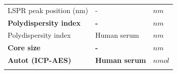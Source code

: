\documentclass[utf8]{frontiersHLTH} %
\begin{document}
\begin{longtable}[]{@{}lll@{}}
\begin{minipage}[t]{0.58\columnwidth}
LSPR peak position (nm)\strut
\end{minipage} & \begin{minipage}[t]{0.20\columnwidth}\raggedright\strut
-\strut
\end{minipage} & \begin{minipage}[t]{0.13\columnwidth}\raggedright\strut
\(nm\)\strut
\end{minipage}\tabularnewline
\begin{minipage}[t]{0.58\columnwidth}\raggedright\strut
\textbf{Polydispersity index}\strut
\end{minipage} & \begin{minipage}[t]{0.20\columnwidth}\raggedright\strut
\textbf{-}\strut
\end{minipage} & \begin{minipage}[t]{0.13\columnwidth}\raggedright\strut
\(nm\)\strut
\end{minipage}\tabularnewline
\begin{minipage}[t]{0.58\columnwidth}\raggedright\strut
Polydispersity index\strut
\end{minipage} & \begin{minipage}[t]{0.20\columnwidth}\raggedright\strut
Human serum\strut
\end{minipage} & \begin{minipage}[t]{0.13\columnwidth}\raggedright\strut
\(nm\)\strut
\end{minipage}\tabularnewline
\begin{minipage}[t]{0.58\columnwidth}\raggedright\strut
\textbf{Core size}\strut
\end{minipage} & \begin{minipage}[t]{0.20\columnwidth}\raggedright\strut
\textbf{-}\strut
\end{minipage} & \begin{minipage}[t]{0.13\columnwidth}\raggedright\strut
\(nm\)\strut
\end{minipage}\tabularnewline
\begin{minipage}[t]{0.58\columnwidth}\raggedright\strut
\textbf{Autot (ICP-AES)}\strut
\end{minipage} & \begin{minipage}[t]{0.20\columnwidth}\raggedright\strut
\textbf{Human serum}\strut
\end{minipage} & \begin{minipage}[t]{0.13\columnwidth}\raggedright\strut
\(nmol\)\strut
\end{minipage}\tabularnewline
\begin{minipage}[t]{0.58\columnwidth}\raggedright\strut

\end{minipage}
\end{longtable}
\end{document}

